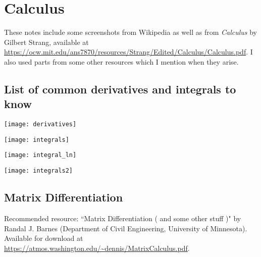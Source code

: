 %
%
%
%
%
%
%
%
%
%
%
%
%
%

\section{Calculus}

These notes include some screenshots from Wikipedia as well as from \textit{Calculus} by Gilbert Strang, available at \url{https://ocw.mit.edu/ans7870/resources/Strang/Edited/Calculus/Calculus.pdf}. I also used parts from some other resources which I mention when they arise.

\subsection{List of common derivatives and integrals to know}

\texttt{[image: derivatives]}

\texttt{[image: integrals]}

\texttt{[image: integral\_ln]}

\texttt{[image: integrals2]}

\subsection{Matrix Differentiation}

Recommended resource: ``Matrix Differentiation ( and some other stuff )" by Randal J. Barnes (Department of Civil Engineering, University of Minnesota). Available for download at \url{https://atmos.washington.edu/~dennis/MatrixCalculus.pdf}.

